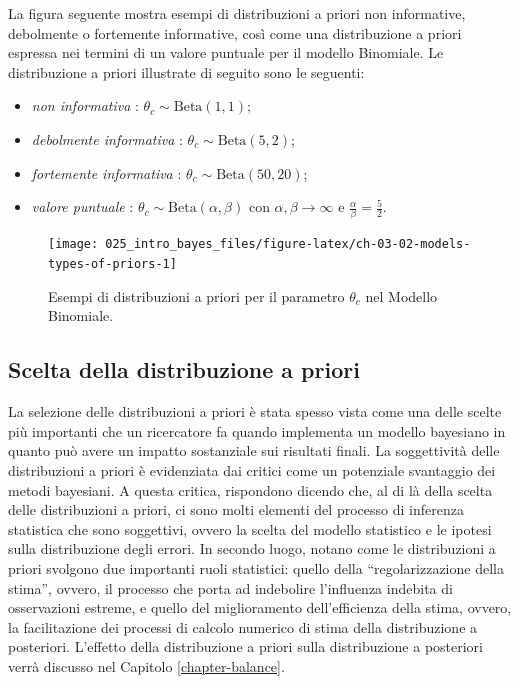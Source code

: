 \documentclass[
  11pt,
  italian,
  a4paper,
  extrafontsizes,onecolumn,openright
  ]{memoir}
\providecommand{\tightlist}{%
  \setlength{\itemsep}{0pt}\setlength{\parskip}{0pt}}
\begin{document}
La figura seguente mostra esempi di distribuzioni a priori non informative, debolmente o fortemente informative, così come una distribuzione a priori espressa nei termini di un valore puntuale per il modello Binomiale. Le distribuzione a priori illustrate di seguito sono le seguenti:

\begin{itemize}
\tightlist
\item
  \emph{non informativa} : \(\theta_c \sim \text{Beta}(1,1)\);
\item
  \emph{debolmente informativa} : \(\theta_c \sim \text{Beta}(5,2)\);
\item
  \emph{fortemente informativa} : \(\theta_c \sim \text{Beta}(50,20)\);
\item
  \emph{valore puntuale} : \(\theta_c \sim \text{Beta}(\alpha, \beta)\) con \(\alpha, \beta \rightarrow \infty\) e \(\frac{\alpha}{\beta} = \frac{5}{2}\).
\end{itemize}

\begin{figure}

{\centering \texttt{[image: 025\_intro\_bayes\_files/figure-latex/ch-03-02-models-types-of-priors-1]} 

}

\caption{Esempi di distribuzioni a priori per il parametro $\theta_c$ nel Modello Binomiale.}\label{fig:ch-03-02-models-types-of-priors}
\end{figure}

\hypertarget{scelta-della-distribuzione-a-priori}{%
\subsection{Scelta della distribuzione a priori}\label{scelta-della-distribuzione-a-priori}}

La selezione delle distribuzioni a priori è stata spesso vista come una delle scelte più importanti che un ricercatore fa quando implementa un modello bayesiano in quanto può avere un impatto sostanziale sui risultati finali. La soggettività delle distribuzioni a priori è evidenziata dai critici come un potenziale svantaggio dei metodi bayesiani. A questa critica, \textcite{vandeSchoot2021modelling} rispondono dicendo che, al di là della scelta delle distribuzioni a priori, ci sono molti elementi del processo di inferenza statistica che sono soggettivi, ovvero la scelta del modello statistico e le ipotesi sulla distribuzione degli errori. In secondo luogo, \textcite{vandeSchoot2021modelling} notano come le distribuzioni a priori svolgono due importanti ruoli statistici: quello della ``regolarizzazione della stima'', ovvero, il processo che porta ad indebolire l'influenza indebita di osservazioni estreme, e quello del miglioramento dell'efficienza della stima, ovvero, la facilitazione dei processi di calcolo numerico di stima della distribuzione a posteriori. L'effetto della distribuzione a priori sulla distribuzione a posteriori verrà discusso nel Capitolo \ref{chapter-balance}.
\end{document}
